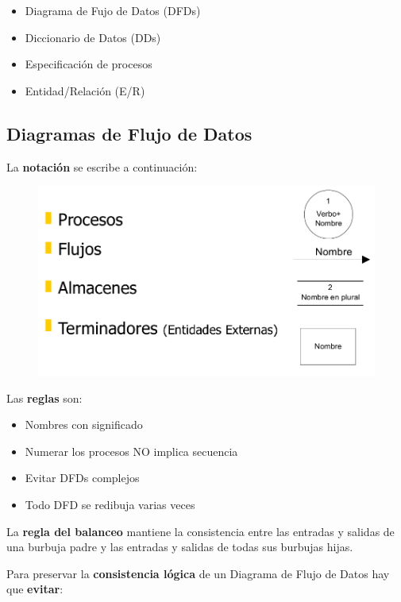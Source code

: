 \begin{itemize}[noitemsep]
\item Diagrama de Fujo de Datos (DFDs)
\item Diccionario de Datos (DDs)
\item Especificación de procesos
\item Entidad/Relación (E/R)
\end{itemize}

\subsection{Diagramas de Flujo de Datos} %
La \textbf{notación} se escribe a continuación:

\begin{figure}[H]
  \includegraphics[width=\textwidth]{./images/dfds.png}
\end{figure}

Las \textbf{reglas} son:

\begin{itemize}[noitemsep]
\item Nombres con significado
\item Numerar los procesos NO implica secuencia
\item Evitar DFDs complejos
\item Todo DFD se redibuja varias veces
\end{itemize}

La \textbf{regla del balanceo} mantiene la consistencia entre las entradas y salidas de una burbuja padre y las entradas y salidas de todas sus burbujas hijas.

Para preservar la \textbf{consistencia lógica} de un Diagrama de Flujo de Datos hay que \textbf{evitar}:

